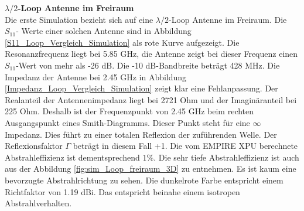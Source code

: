 \textbf{$\lambda/2$-Loop Antenne im Freiraum}\\
Die erste Simulation bezieht sich auf eine $\lambda/2$-Loop Antenne im Freiraum. Die $S_{11}$- Werte einer solchen Antenne sind in Abbildung \ref{S11_Loop_Vergleich_Simulation} als rote Kurve aufgezeigt. Die Resonanzfrequenz liegt bei 5.85 GHz, die Antenne zeigt bei dieser Frequenz einen $S_{11}$-Wert von mehr als -26 dB. Die -10 dB-Bandbreite beträgt 428 MHz. Die Impedanz der Antenne bei 2.45 GHz in Abbildung \ref{Impedanz_Loop_Vergleich_Simulation} zeigt klar eine Fehlanpassung. Der Realanteil der Antennenimpedanz liegt bei 2721 Ohm und der Imaginäranteil bei 225 Ohm. Deshalb ist der Frequenzpunkt von 2.45 GHz beim rechten Ausgangspunkt eines Smith-Diagramms. Dieser Punkt steht für eine $\infty$ Impedanz. Dies führt zu einer totalen Reflexion der zuführenden Welle. Der Reflexionsfaktor $\Gamma$ beträgt in diesem Fall +1. Die vom EMPIRE XPU berechnete Abstrahleffizienz ist dementsprechend $1\%$. Die sehr tiefe Abstrahleffizienz ist auch aus der Abbildung \ref{fig:sim_Loop_freiraum_3D} zu entnehmen. Es ist kaum eine bevorzugte Abstrahlrichtung zu sehen. Die dunkelrote Farbe entspricht einem Richtfaktor von 1.19 dBi. Das entspricht beinahe einem isotropen Abstrahlverhalten.\\


